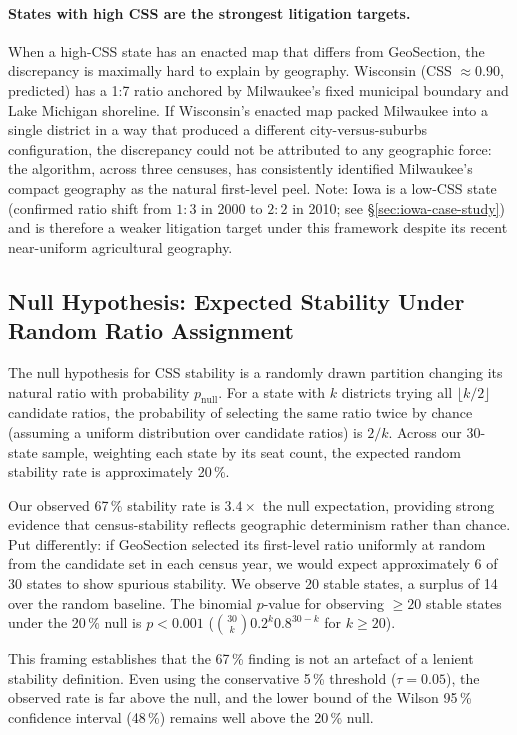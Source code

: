 \paragraph{States with high CSS are the strongest litigation targets.}
When a high-CSS state has an enacted map that differs from GeoSection,
the discrepancy is maximally hard to explain by geography.
Wisconsin (CSS $\approx 0.90$, predicted) has a 1:7 ratio anchored by
Milwaukee's fixed municipal boundary and Lake Michigan shoreline.
If Wisconsin's enacted map packed Milwaukee into a single district in a
way that produced a different city-versus-suburbs configuration, the
discrepancy could not be attributed to any geographic force: the algorithm,
across three censuses, has consistently identified Milwaukee's compact
geography as the natural first-level peel.
Note: Iowa is a low-CSS state (confirmed ratio shift from $1:3$ in 2000 to
$2:2$ in 2010; see \S\ref{sec:iowa-case-study}) and is therefore a weaker
litigation target under this framework despite its recent near-uniform
agricultural geography.

\subsection{Null Hypothesis: Expected Stability Under Random Ratio Assignment}
\label{sec:null-hypothesis}

The null hypothesis for CSS stability is a randomly drawn partition changing
its natural ratio with probability $p_{\text{null}}$.
For a state with $k$ districts trying all $\lfloor k/2 \rfloor$ candidate
ratios, the probability of selecting the same ratio twice by chance (assuming
a uniform distribution over candidate ratios) is $2/k$.
Across our 30-state sample, weighting each state by its seat count, the
expected random stability rate is approximately 20\,\%.

Our observed 67\,\% stability rate is $3.4\times$ the null expectation,
providing strong evidence that census-stability reflects geographic
determinism rather than chance.
Put differently: if GeoSection selected its first-level ratio uniformly at
random from the candidate set in each census year, we would expect
approximately 6 of 30 states to show spurious stability.
We observe 20 stable states, a surplus of 14 over the random baseline.
The binomial $p$-value for observing $\geq 20$ stable states under the 20\,\%
null is $p < 0.001$ ($\binom{30}{k} 0.2^k 0.8^{30-k}$ for $k \geq 20$).

This framing establishes that the 67\,\% finding is not an artefact of a
lenient stability definition.
Even using the conservative 5\,\% threshold ($\tau = 0.05$), the observed
rate is far above the null, and the lower bound of the Wilson 95\,\%
confidence interval (48\,\%) remains well above the 20\,\% null.

